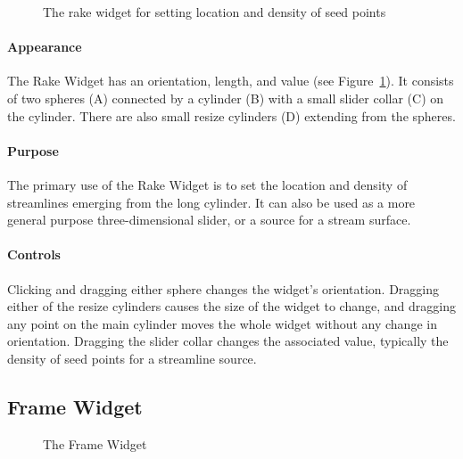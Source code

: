 \begin{figure}[htb]
  \begin{makeimage}
  \end{makeimage}
  \rakewidget
  \caption{\label{fig:rakewidget} The rake widget for setting location and
    density of seed points}
\end{figure}

\paragraph{Appearance} The Rake
Widget has an orientation, length, and value (see Figure~\ref{fig:rakewidget}). It consists of two spheres (A) connected by a cylinder (B) with a
small slider collar (C) on the cylinder.  There are also small resize
cylinders (D) extending from the spheres.

\paragraph{Purpose} The primary use of the Rake Widget is to set the
location and density of streamlines emerging from the long cylinder.  It
can also be used as a more general purpose three-dimensional slider, or a
source for a stream surface. 

\paragraph{Controls} Clicking and dragging either sphere changes the widget's orientation.  Dragging either of the resize
cylinders causes the size of the widget to change, and dragging any point on
the main cylinder moves the whole widget without any change in orientation.
Dragging the slider collar changes the associated value, typically the
density of seed points for a streamline source.

\subsection{Frame Widget}
\label{sec:view-framewidget} 

\begin{figure}[htb]
  \begin{makeimage}
  \end{makeimage}
  \framewidget
  \caption{\label{fig:framewidget} The Frame Widget}
\end{figure}


